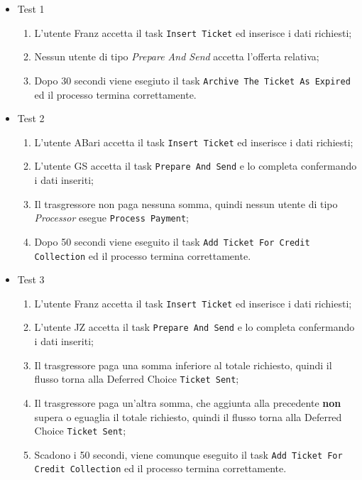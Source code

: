 \documentclass[../Relazione.tex]{subfiles}
\begin{document}
    \begin{itemize}
        \item Test 1
        \begin{enumerate}
            \item L'utente Franz accetta il task \texttt{Insert Ticket} ed inserisce i dati richiesti;
            \item Nessun utente di tipo \textit{Prepare And Send} accetta l'offerta relativa;
            \item Dopo 30 secondi viene esegiuto il task \texttt{Archive The Ticket As Expired} ed il processo termina correttamente.
        \end{enumerate}
        \item Test 2
        \begin{enumerate}
            \item L'utente ABari accetta il task \texttt{Insert Ticket} ed inserisce i dati richiesti;
            \item L'utente GS accetta il task \texttt{Prepare And Send} e lo completa confermando i dati inseriti;
            \item Il trasgressore non paga nessuna somma, quindi nessun utente di tipo \textit{Processor} esegue \texttt{Process Payment};
            \item Dopo 50 secondi viene eseguito il task \texttt{Add Ticket For Credit Collection} ed il processo termina correttamente.
        \end{enumerate}
        \item Test 3
        \begin{enumerate}
            \item L'utente Franz accetta il task \texttt{Insert Ticket} ed inserisce i dati richiesti;
            \item L'utente JZ accetta il task \texttt{Prepare And Send} e lo completa confermando i dati inseriti;
            \item Il trasgressore paga una somma inferiore al totale richiesto, quindi il flusso torna alla Deferred Choice \texttt{Ticket Sent};
            \item Il trasgressore paga un'altra somma, che aggiunta alla precedente \textbf{non} supera o eguaglia il totale richiesto, quindi il flusso torna alla Deferred Choice \texttt{Ticket Sent};
            \item Scadono i 50 secondi, viene comunque eseguito il task \texttt{Add Ticket For Credit Collection} ed il processo termina correttamente.
        \end{enumerate}

\end{itemize}
\end{document}

